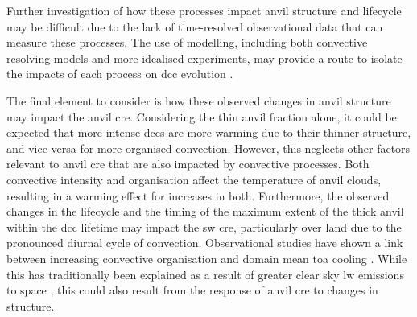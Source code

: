 Further investigation of how these processes impact anvil structure and lifecycle may be difficult due to the lack of time-resolved observational data that can measure these processes.
The use of modelling, including both convective resolving models and more idealised experiments, may provide a route to isolate the impacts of each process on \acrshort{dcc} evolution \citep{gasparini_diurnal_2022}.

The final element to consider is how these observed changes in anvil structure may impact the anvil \acrshort{cre}.
Considering the thin anvil fraction alone, it could be expected that more intense \acrshort{dcc}s are more warming due to their thinner structure, and vice versa for more organised convection.
However, this neglects other factors relevant to anvil \acrshort{cre} that are also impacted by convective processes.
Both convective intensity and organisation affect the temperature of anvil clouds, resulting in a warming effect for increases in both.
Furthermore, the observed changes in the lifecycle and the timing of the maximum extent of the thick anvil within the \acrshort{dcc} lifetime may impact the \acrshort{sw} \acrshort{cre}, particularly over land due to the pronounced diurnal cycle of convection.
Observational studies have shown a link between increasing convective organisation and domain mean \acrshort{toa} cooling \citep{bony_observed_2020}.
While this has traditionally been explained as a result of greater clear sky \acrshort{lw} emissions to space \citep{bony_thermodynamic_2016}, this could also result from the response of anvil \acrshort{cre} to changes in structure.

